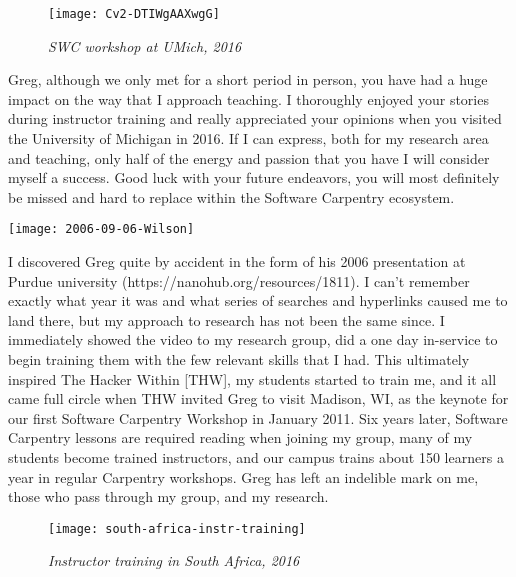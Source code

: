
\newpage

\begin{figure}[h!]
\begin{center}
\texttt{[image: Cv2-DTIWgAAXwgG]}
    \caption*{\textit{SWC workshop at UMich, 2016}}
\end{center}
\end{figure}

Greg, although we only met for a short period in person, you have had a huge
impact on the way that I approach teaching.  I thoroughly enjoyed your stories
during instructor training and really appreciated your opinions when you
visited the University of Michigan in 2016.  If I can express, both for my
research area and teaching, only half of the energy and passion that you have I
will consider myself a success.  Good luck with your future endeavors, you will
most definitely be missed and hard to replace within the Software Carpentry
ecosystem.     


\newpage

\begin{center}
\texttt{[image: 2006-09-06-Wilson]}
\end{center}

I discovered Greg quite by accident in the form of his 2006 presentation at
Purdue university (https://nanohub.org/resources/1811).  I can't remember
exactly what year it was and what series of searches and hyperlinks caused me
to land there, but my approach to research has not been the same since.  I
immediately showed the video to my research group, did a one day in-service to
begin training them with the few relevant skills that I had.  This ultimately
inspired The Hacker Within [THW], my students started to train me, and it all
came full circle when THW invited Greg to visit Madison, WI, as the keynote for
our first Software Carpentry Workshop in January 2011. Six years later,
Software Carpentry lessons are required reading when joining my group, many of
my students become trained instructors, and our campus trains about 150
learners a year in regular Carpentry workshops.  Greg has left an indelible
mark on me, those who pass through my group, and my research.


\newpage
\vspace*{\fill}
\begin{figure}[h!]
\begin{center}
\texttt{[image: south-africa-instr-training]}
\caption*{\textit{Instructor training in South Africa, 2016}}
\end{center}
\end{figure}


